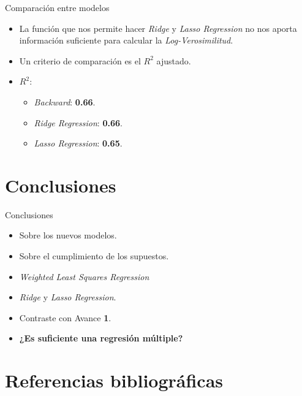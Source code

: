 \documentclass[11pt]{beamer}
\begin{document}
\begin{frame}{Comparación entre modelos}
	\begin{itemize}
		\item La función que nos permite hacer \textit{Ridge} y \textit{Lasso Regression} no nos aporta información suficiente para calcular la \textit{Log-Verosimilitud}.
		\pause
		\item Un criterio de comparación es el $R^2$ ajustado.
		\pause
		\item $R^2$:
		\begin{itemize}
			\item \textit{Backward}: \textbf{0.66}.
			\item \textit{Ridge Regression}: \textbf{0.66}.
			\item \textit{Lasso Regression}: \textbf{0.65}.
		\end{itemize}
	\end{itemize}
\end{frame}

\section{Conclusiones}

\begin{frame}{Conclusiones}
	\begin{itemize}
		\item Sobre los nuevos modelos.
		\pause
		\item Sobre el cumplimiento de los supuestos.
		\pause
		\item \textit{Weighted Least Squares Regression}
		\pause
		\item \textit{Ridge} y \textit{Lasso Regression}.
		\pause
		\item Contraste con Avance \textbf{1}.
		\pause
		\item \textbf{¿Es suficiente una regresión múltiple?}
	\end{itemize}
\end{frame}


\section{Referencias bibliográficas}
\end{document}
